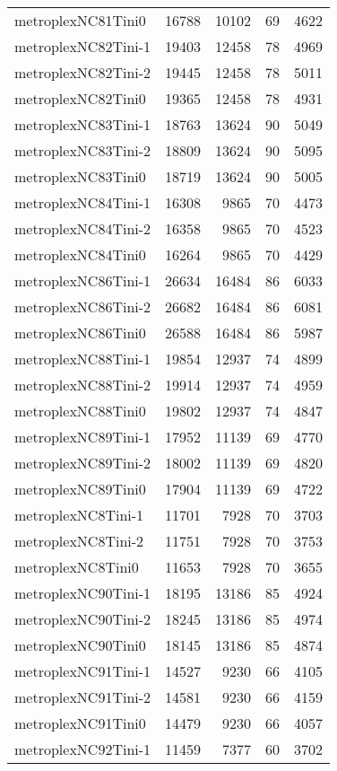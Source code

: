 \begin{tabular}{lrrrr}
metroplexNC81Tini0 & 16788 & 10102 & 69 & 4622 \\
metroplexNC82Tini-1 & 19403 & 12458 & 78 & 4969 \\
metroplexNC82Tini-2 & 19445 & 12458 & 78 & 5011 \\
metroplexNC82Tini0 & 19365 & 12458 & 78 & 4931 \\
metroplexNC83Tini-1 & 18763 & 13624 & 90 & 5049 \\
metroplexNC83Tini-2 & 18809 & 13624 & 90 & 5095 \\
metroplexNC83Tini0 & 18719 & 13624 & 90 & 5005 \\
metroplexNC84Tini-1 & 16308 & 9865 & 70 & 4473 \\
metroplexNC84Tini-2 & 16358 & 9865 & 70 & 4523 \\
metroplexNC84Tini0 & 16264 & 9865 & 70 & 4429 \\
metroplexNC86Tini-1 & 26634 & 16484 & 86 & 6033 \\
metroplexNC86Tini-2 & 26682 & 16484 & 86 & 6081 \\
metroplexNC86Tini0 & 26588 & 16484 & 86 & 5987 \\
metroplexNC88Tini-1 & 19854 & 12937 & 74 & 4899 \\
metroplexNC88Tini-2 & 19914 & 12937 & 74 & 4959 \\
metroplexNC88Tini0 & 19802 & 12937 & 74 & 4847 \\
metroplexNC89Tini-1 & 17952 & 11139 & 69 & 4770 \\
metroplexNC89Tini-2 & 18002 & 11139 & 69 & 4820 \\
metroplexNC89Tini0 & 17904 & 11139 & 69 & 4722 \\
metroplexNC8Tini-1 & 11701 & 7928 & 70 & 3703 \\
metroplexNC8Tini-2 & 11751 & 7928 & 70 & 3753 \\
metroplexNC8Tini0 & 11653 & 7928 & 70 & 3655 \\
metroplexNC90Tini-1 & 18195 & 13186 & 85 & 4924 \\
metroplexNC90Tini-2 & 18245 & 13186 & 85 & 4974 \\
metroplexNC90Tini0 & 18145 & 13186 & 85 & 4874 \\
metroplexNC91Tini-1 & 14527 & 9230 & 66 & 4105 \\
metroplexNC91Tini-2 & 14581 & 9230 & 66 & 4159 \\
metroplexNC91Tini0 & 14479 & 9230 & 66 & 4057 \\
metroplexNC92Tini-1 & 11459 & 7377 & 60 & 3702 \\

\end{tabular}
